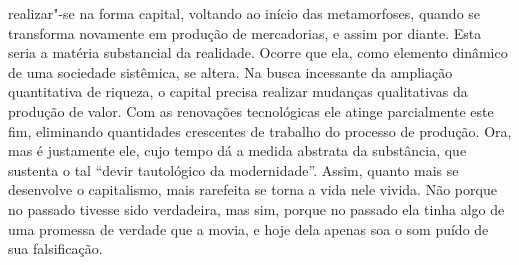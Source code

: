 realizar"-se na forma capital, voltando ao início das metamorfoses,
quando se transforma novamente em produção de mercadorias, e assim por
diante. Esta seria a matéria substancial da realidade. Ocorre que ela,
como elemento dinâmico de uma sociedade sistêmica, se altera. Na busca
incessante da ampliação quantitativa de riqueza, o capital precisa
realizar mudanças qualitativas da produção de valor. Com as renovações
tecnológicas ele atinge parcialmente este fim, eliminando quantidades
crescentes de trabalho do processo de produção. Ora, mas é justamente
ele, cujo tempo dá a medida abstrata da substância, que sustenta o tal
``devir tautológico da modernidade''. Assim, quanto mais se desenvolve o
capitalismo, mais rarefeita se torna a vida nele vivida. Não porque no
passado tivesse sido verdadeira, mas sim, porque no passado ela tinha
algo de uma promessa de verdade que a movia, e hoje dela apenas soa o
som puído de sua falsificação.

